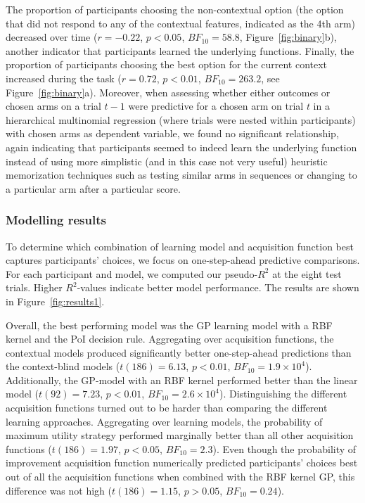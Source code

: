 \documentclass[a4paper,natbib]{apa6}
\begin{document}
The proportion of participants choosing the non-contextual option (the option that did not respond to any of the contextual features, indicated as the 4th arm) decreased over time ($r=-0.22$, $p<0.05$, $BF_{10}=58.8$, Figure~\ref{fig:binary}b), another indicator that participants learned the underlying functions. Finally, the proportion of participants choosing the best option for the current context increased during the task ($r=0.72$, $p<0.01$, $BF_{10}=263.2$, see Figure~\ref{fig:binary}a). Moreover, when assessing whether either outcomes or chosen arms on a trial $t-1$ were predictive for a chosen arm on trial $t$ in a hierarchical multinomial regression (where trials were nested within participants) with chosen arms as dependent variable, we found no significant relationship, again indicating that participants seemed to indeed learn the underlying function instead of using more simplistic (and in this case not very useful) heuristic memorization techniques such as testing similar arms in sequences or changing to a particular arm after a particular score. 



\subsubsection{Modelling results}
To determine which combination of learning model and acquisition function best captures participants' choices, we focus on one-step-ahead predictive comparisons.  For each participant and model, we computed our pseudo-$R^2$ at the eight test trials. Higher $R^2$-values indicate better model performance. The results are shown in Figure~\ref{fig:results1}.

Overall, the best performing model was the GP learning model with a RBF kernel and the PoI decision rule. Aggregating over acquisition functions, the contextual models produced significantly better one-step-ahead predictions than the context-blind models ($t(186)=6.13$, $p<0.01$, $BF_{10}=1.9\times10^4$). Additionally, the GP-model with an RBF kernel performed better than the linear model ($t(92)=7.23$, $p<0.01$, $BF_{10}=2.6\times10^4$). Distinguishing the different acquisition functions turned out to be harder than comparing the different learning approaches. Aggregating over learning models, the probability of maximum utility strategy performed marginally better than all other acquisition functions ($t(186)=1.97$, $p<0.05$, $BF_{10}=2.3$). Even though the probability of improvement acquisition function numerically predicted participants' choices best out of all the acquisition functions when combined with the RBF kernel GP, this difference was not high ($t(186)=1.15$, $p>0.05$, $BF_{10}=0.24$).
\end{document}
